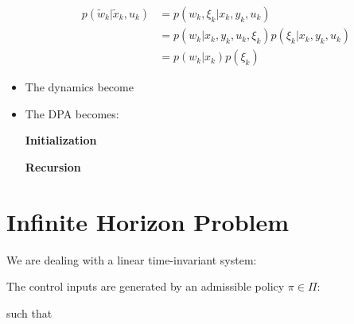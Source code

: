 \documentclass[10pt,a4paper]{scrartcl}
\begin{document}
\begin{multicols*}{2}
\begin{itemize}
\begin{align*}
p(\tilde{w}_k|\tilde{x}_k,u_k)&=p(w_k,\xi_k|x_k,y_k,u_k)\\
&=p(w_k|x_k,y_k,u_k,\xi_k)p(\xi_k|x_k,y_k,u_k)\\
&=p(w_k|x_k)p(\xi_k)
\end{align*}
\item The dynamics become

\item The DPA becomes:

\textbf{Initialization}


\textbf{Recursion}

\end{itemize}

\section{Infinite Horizon Problem}

We are dealing with a linear time-invariant system:


The control inputs are generated by an admissible policy $\pi\in\Pi$:


such that



\end{multicols*}
\end{document}
